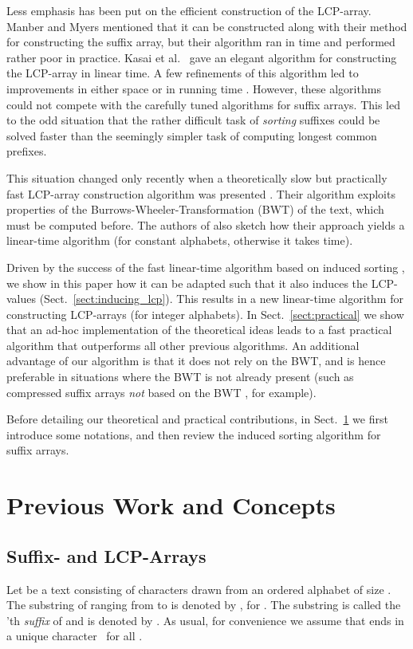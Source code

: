 \documentclass[11pt,onecolumn,final]{article} \usepackage[latin1]{inputenc}
\theoremstyle{plain}
\theoremstyle{remark}
\begin{document}
Less emphasis has been put on the efficient construction of the LCP-array. Manber and Myers \cite{manber93suffix} mentioned that it can be constructed along with their method for constructing the suffix array, but their algorithm ran in  time and performed rather poor in practice. Kasai et al.~\cite{kasai01linear} gave an elegant algorithm for constructing the LCP-array in linear time. A few refinements of this algorithm led to improvements in either space \cite{manzini04two} or in running time \cite{kaerkkaeinen09permuted}. However, these algorithms could not compete with the carefully tuned algorithms for suffix arrays. This led to the odd situation that the rather difficult task of \emph{sorting} suffixes could be solved faster than the seemingly simpler task of computing longest common prefixes.

This situation changed only recently when a theoretically slow  but practically fast LCP-array construction algorithm was presented \cite{gog11fast}. Their algorithm exploits properties of the Burrows-Wheeler-Transformation (BWT) of the text, which must be computed before. The authors of \cite{gog11fast} also sketch how their approach yields a linear-time algorithm (for constant alphabets, otherwise it takes  time).

Driven by the success of the fast linear-time algorithm based on induced sorting \cite{nong09linear}, we show in this paper how it can be adapted such that it also induces the LCP-values (Sect.~\ref{sect:inducing_lcp}). This results in a new linear-time algorithm for constructing LCP-arrays (for integer alphabets). In Sect.~\ref{sect:practical} we show that an ad-hoc implementation of the theoretical ideas leads to a fast practical algorithm that outperforms all other previous algorithms. An additional advantage of our algorithm is that it does not rely on the BWT, and is hence preferable in situations where the BWT is not already present (such as compressed suffix arrays \emph{not} based on the BWT \cite{navarro07compressed}, for example).

Before detailing our theoretical and practical contributions, in Sect.~\ref{sect:preliminaries} we first introduce some notations, and then review the induced sorting algorithm for suffix arrays.


\section{Previous Work and Concepts}
\label{sect:preliminaries}
\subsection{Suffix- and LCP-Arrays}
\label{sec:succ-data-struct}
Let  be a text consisting of  characters drawn from an ordered alphabet  of size . The substring of  ranging from  to  is denoted by , for . The substring  is called the 'th \emph{suffix} of  and is denoted by . As usual, for convenience we assume that  ends in a unique character \ for all .
\end{document}
